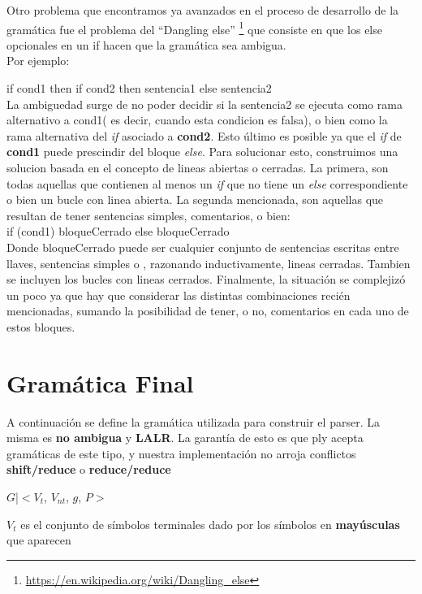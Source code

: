 Otro problema que encontramos ya avanzados en el proceso de desarrollo de la gramática fue el problema del ``Dangling else'' \footnote{\url{https://en.wikipedia.org/wiki/Dangling_else}} que consiste en que los else opcionales en un if hacen que la gramática sea ambigua. 
\\
Por ejemplo: 

if cond1 then if cond2 then sentencia1 else sentencia2 \\

La ambiguedad surge de no poder decidir si la sentencia2 se ejecuta como rama alternativo a cond1( es decir, cuando esta condicion es falsa), o bien como la rama alternativa del \textit{if} asociado a \textbf{cond2}. Esto último es posible ya que el \textit{if} de \textbf{cond1} puede prescindir del bloque \textit{else}.
Para solucionar esto, construimos una solucion basada en el concepto de lineas abiertas o cerradas. La primera, son todas aquellas que contienen al menos un \textit{if} que no tiene un \textit{else} correspondiente o bien un bucle con linea abierta. La segunda mencionada, son aquellas que resultan de tener sentencias simples, comentarios, o bien: \\

if (cond1) bloqueCerrado else bloqueCerrado \\

Donde bloqueCerrado puede ser cualquier conjunto de sentencias escritas entre llaves, sentencias simples o , razonando inductivamente, lineas cerradas. Tambien se incluyen los bucles con lineas cerrados. Finalmente, la situación se complejizó un poco ya que hay que considerar las distintas combinaciones recién mencionadas, sumando la posibilidad de tener, o no, comentarios en cada uno de estos bloques.


\section{Gramática Final}
A continuación se define la gramática utilizada para construir el parser. La misma es \textbf{no ambigua} y \textbf{LALR}. La garantía de esto es que ply acepta gramáticas de este tipo, y nuestra implementación no arroja conflictos \textbf{shift/reduce} o \textbf{reduce/reduce} \\

\linespread{1.125}\selectfont

$G$|$<V_{t}$, $V_{nt}$, $g$, $P>$

$V_{t}$ es el conjunto de símbolos terminales dado por los símbolos en \textbf{mayúsculas} que aparecen 

